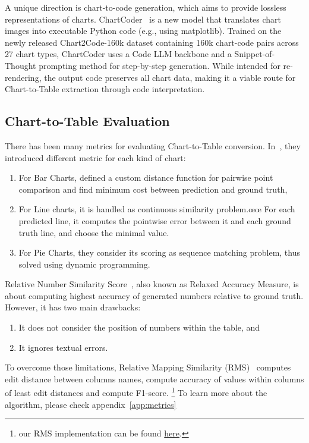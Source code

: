 \documentclass[
	letterpaper, %
]{jdf}
\begin{document}
A unique direction is chart-to-code generation, which aims to provide lossless representations of charts. ChartCoder~\cite{zhao2025chartcoder} is a new model that translates chart images into executable Python code (e.g., using matplotlib). Trained on the newly released Chart2Code-160k dataset containing 160k chart-code pairs across 27 chart types, ChartCoder uses a Code LLM backbone and a Snippet-of-Thought prompting method for step-by-step generation. While intended for re-rendering, the output code preserves all chart data, making it a viable route for Chart-to-Table extraction through code interpretation.

\subsection{Chart-to-Table Evaluation}\label{ssect:task-evaluation}
There has been many metrics for evaluating Chart-to-Table conversion.
In~\cite{luo2021chartocr}, they introduced different metric for each kind of chart:
\begin{enumerate}
         \item For Bar Charts, defined a custom distance function for pairwise point comparison and find minimum cost between prediction and ground truth,
         \item For Line charts, it is handled as continuous similarity problem.œœ
             For each predicted line, it computes the pointwise error between it and each ground truth line, and choose the minimal value.
         \item For Pie Charts, they consider its scoring as sequence matching problem, thus solved using dynamic programming.
              \end{enumerate}
Relative Number Similarity Score~\cite{masry2022chartqa}, also known as Relaxed Accuracy Measure, is about  computing highest accuracy of generated numbers relative to ground truth.
However, it has two main drawbacks:
\begin{enumerate}
         \item It does not consider the position of numbers within the table, and
         \item It ignores textual errors.
              \end{enumerate}
To overcome those limitations, Relative Mapping Similarity (RMS)~\cite{liu2022deplot} computes edit distance between columns names, compute accuracy of values within columns of least edit distances and compute F1-score.
\footnote{our RMS implementation can be found \href{https://github.gatech.edu/mfayed8/GIE-metrics}{here}.}
To learn more about the algorithm, please check appendix~\ref{app:metrics}
\end{document}
